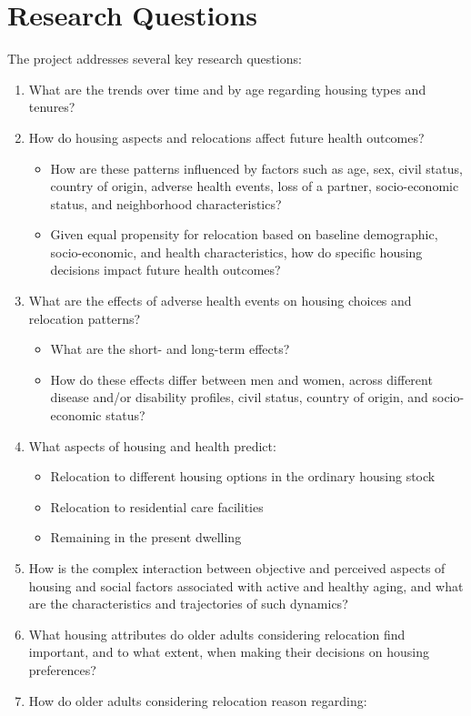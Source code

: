 \documentclass[
]{book}
\begin{document}
\hypertarget{research-questions}{%
\section{Research Questions}\label{research-questions}}

The project addresses several key research questions:

\begin{enumerate}
\def\labelenumi{\arabic{enumi}.}
\item
  What are the trends over time and by age regarding housing types and tenures?
\item
  How do housing aspects and relocations affect future health outcomes?

  \begin{itemize}
  \item
    How are these patterns influenced by factors such as age, sex, civil status, country of origin, adverse health events, loss of a partner, socio-economic status, and neighborhood characteristics?
  \item
    Given equal propensity for relocation based on baseline demographic, socio-economic, and health characteristics, how do specific housing decisions impact future health outcomes?
  \end{itemize}
\item
  What are the effects of adverse health events on housing choices and relocation patterns?

  \begin{itemize}
  \item
    What are the short- and long-term effects?
  \item
    How do these effects differ between men and women, across different disease and/or disability profiles, civil status, country of origin, and socio-economic status?
  \end{itemize}
\item
  What aspects of housing and health predict:

  \begin{itemize}
  \item
    Relocation to different housing options in the ordinary housing stock
  \item
    Relocation to residential care facilities
  \item
    Remaining in the present dwelling
  \end{itemize}
\item
  How is the complex interaction between objective and perceived aspects of housing and social factors associated with active and healthy aging, and what are the characteristics and trajectories of such dynamics?
\item
  What housing attributes do older adults considering relocation find important, and to what extent, when making their decisions on housing preferences?
\item
  How do older adults considering relocation reason regarding:


\end{enumerate}
\end{document}
